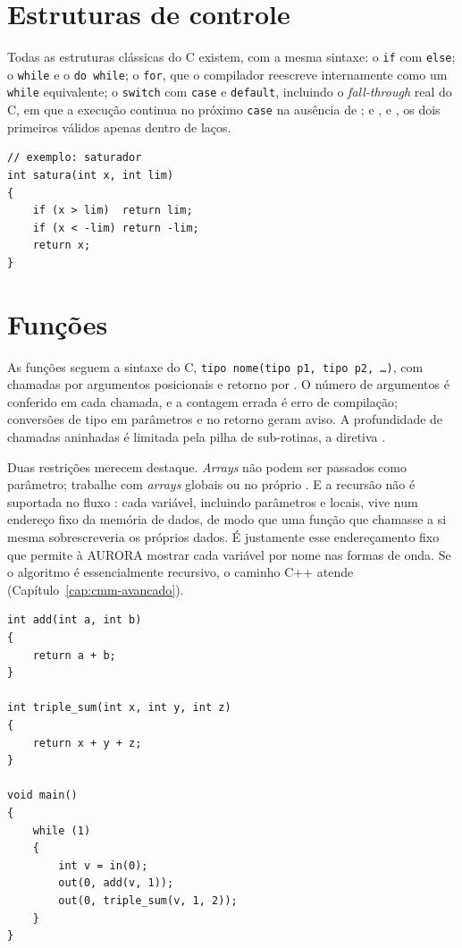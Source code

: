 \section{Estruturas de controle}

Todas as estruturas clássicas do C existem, com a mesma sintaxe: o \texttt{if} com \texttt{else}; o \texttt{while} e o \texttt{do while}; o \texttt{for}, que o compilador reescreve internamente como um \texttt{while} equivalente; o \texttt{switch} com \texttt{case} e \texttt{default}, incluindo o \textit{fall-through} real do C, em que a execução continua no próximo \texttt{case} na ausência de ; e ,  e , os dois primeiros válidos apenas dentro de laços.

\begin{lstlisting}[style=cmm]
// exemplo: saturador
int satura(int x, int lim)
{
    if (x > lim)  return lim;
    if (x < -lim) return -lim;
    return x;
}
\end{lstlisting}

\section{Funções}

As funções seguem a sintaxe do C, \texttt{tipo nome(tipo p1, tipo p2, \ldots)}, com chamadas por argumentos posicionais e retorno por . O número de argumentos é conferido em cada chamada, e a contagem errada é erro de compilação; conversões de tipo em parâmetros e no retorno geram aviso. A profundidade de chamadas aninhadas é limitada pela pilha de sub-rotinas, a diretiva .

Duas restrições merecem destaque. \textit{Arrays} não podem ser passados como parâmetro; trabalhe com \textit{arrays} globais ou no próprio . E a recursão não é suportada no fluxo \cmm{}: cada variável, incluindo parâmetros e locais, vive num endereço fixo da memória de dados, de modo que uma função que chamasse a si mesma sobrescreveria os próprios dados. É justamente esse endereçamento fixo que permite à AURORA mostrar cada variável por nome nas formas de onda. Se o algoritmo é essencialmente recursivo, o caminho C++ atende (Capítulo~\ref{cap:cmm-avancado}).

\begin{lstlisting}[style=cmm]
int add(int a, int b)
{
    return a + b;
}

int triple_sum(int x, int y, int z)
{
    return x + y + z;
}

void main()
{
    while (1)
    {
        int v = in(0);
        out(0, add(v, 1));
        out(0, triple_sum(v, 1, 2));
    }
}
\end{lstlisting}


